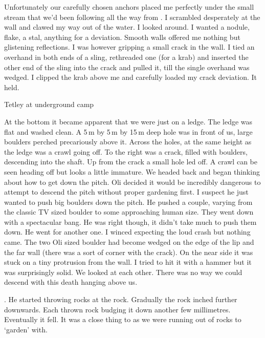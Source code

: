 Unfortunately our carefully chosen anchors placed me perfectly under the small stream that we'd been following all the way from . I scrambled desperately at the wall and clawed my way out of the water. I looked around. I wanted a nodule, flake, a stal, anything for a deviation. Smooth walls offered me nothing but glistening reflections. I was however gripping a small crack in the wall. I tied an overhand in both ends of a sling, rethreaded one (for a krab) and inserted the other end of the sling into the crack and pulled it, till the single overhand was wedged. I clipped the krab above me and carefully loaded my crack deviation. It held.



\begin{marginfigure}
\centering
{}
\label{Monatip-rigging}
\caption{Tetley at underground camp }
\end{marginfigure}

At the bottom it became apparent that we were just on a ledge. The ledge was flat and washed clean. A 5\,m by 5\,m by 15\,m deep hole was in front of us, large boulders perched precariously above it.  Across the holes, at the same height as the ledge was a crawl going off. To the right was a crack, filled with boulders, descending into the shaft. Up from the crack a small hole led off. A crawl can be seen heading off but looks a little immature. We headed back and began thinking about how to get down the pitch.
Oli decided it would be incredibly dangerous to attempt to descend the pitch without proper gardening first. I suspect he just wanted to push big boulders down the pitch. He pushed a couple, varying from the classic TV sized boulder to some approaching human size. They went down with a spectacular bang. He was right though, it didn't take much to push them down. He went for another one. I winced expecting the loud crash but nothing came. The two Oli sized boulder had become wedged on the edge of the lip and the far wall (there was a sort of corner with the crack). On the near side it was stuck on a tiny protrusion from the wall. I tried to hit it with a hammer but it was surprisingly solid. We looked at each other. There was no way we could descend with this death hanging above us. 
 
. He started throwing rocks at the rock. Gradually the rock inched further downwards. Each thrown rock budging it down another few millimetres. Eventually it fell. It was a close thing to as we were running out of rocks to `garden' with.
 
